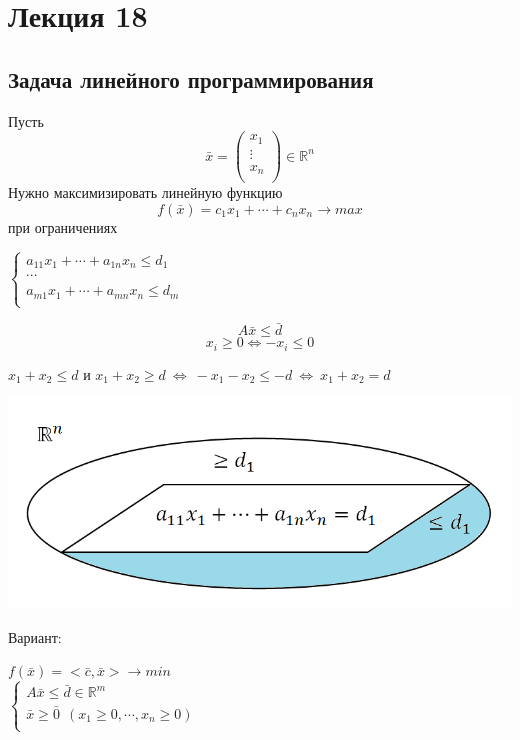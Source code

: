 \newpage
\section{Лекция 18}
\subsection{Задача линейного программирования}
Пусть \[\bar x=\begin{pmatrix}
x_1\\
\vdots\\
x_n\\
\end{pmatrix} \in \mathbb{R}^n\]
Нужно максимизировать линейную функцию $$f(\bar x)=c_1x_1+\cdots +c_nx_n \to max $$ при ограничениях
\begin{center}
    $
    \left\{
    \begin{array}{lcl}
    a_{11}x_1+\cdots +a_{1n}x_n \leqslant d_1\\
    \cdots\\
    a_{m1}x_1+\cdots +a_{mn}x_n \leqslant d_m\\
    \end{array}
    \right.
    $
\end{center}
$$A\bar x \leqslant \bar d$$
$$x_i \geqslant 0 \Leftrightarrow -x_i \leqslant 0$$
\begin{center}
    $x_1+x_2 \leqslant d$ и $x_1+x_2 \geqslant d~\Leftrightarrow~-x_1-x_2\leqslant -d~\Leftrightarrow~x_1+x_2=d$
\end{center}
\begin{center}
    \includegraphics[scale=0.6]{l18_1.png}\\
\end{center}
Вариант:
\begin{center}
    $f(\bar x)=<\bar c, \bar x> \to min$\\
    $
    \left\{
    \begin{array}{lcl}
    A\bar x \leqslant \bar d \in \mathbb{R}^m\\
    \bar x \geqslant \bar 0 ~~(x_1\geqslant 0, \cdots, x_n \geqslant 0)\\
    \end{array}
    \right.
    $
\end{center}
